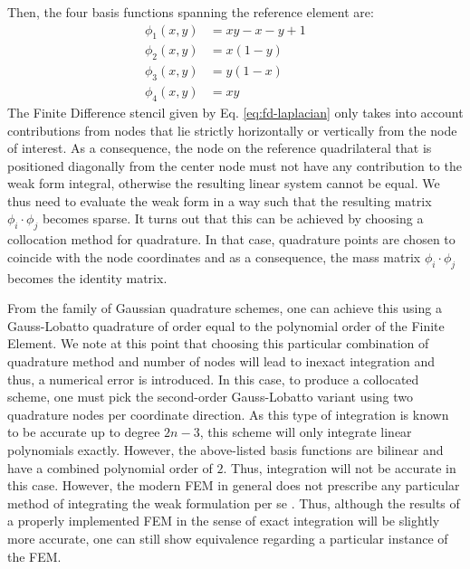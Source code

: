 \documentclass[asi,article,submit,moreauthors]{Definitions/mdpi}
\begin{document}
Then, the four basis functions spanning the reference element are:
\begin{align}
    \phi_1(x,y) &= xy - x - y + 1 &&\\
    \phi_2(x,y) &= x (1 - y) &&\\
    \phi_3(x,y) &= y (1 - x) &&\\
    \phi_4(x,y) &= x y &&
\end{align}
The Finite Difference stencil given by Eq. \ref{eq:fd-laplacian} only takes into account contributions from nodes that lie strictly horizontally or vertically from the node of interest.
As a consequence, the node on the reference quadrilateral that is positioned diagonally from the center node must not have any contribution to the weak form integral, otherwise the resulting linear system cannot be equal.
We thus need to evaluate the weak form in a way such that the resulting matrix $\phi_i \cdot \phi_j$ becomes sparse.
It turns out that this can be achieved by choosing a collocation method for quadrature.
In that case, quadrature points are chosen to coincide with the node coordinates and as a consequence, the mass matrix $\phi_i \cdot \phi_j$ becomes the identity matrix.

From the family of Gaussian quadrature schemes, one can achieve this using a Gauss-Lobatto quadrature of order equal to the polynomial order of the Finite Element.
We note at this point that choosing this particular combination of quadrature method and number of nodes will lead to inexact integration and thus, a numerical error is introduced.
In this case, to produce a collocated scheme, one must pick the second-order Gauss-Lobatto variant using two quadrature nodes per coordinate direction.
As this type of integration is known to be accurate up to degree $2n-3$, this scheme will only integrate linear polynomials exactly.
However, the above-listed basis functions are bilinear and have a combined polynomial order of $2$.
Thus, integration will not be accurate in this case.
However, the modern FEM in general does not prescribe any particular method of integrating the weak formulation per se \cite{ciarletFiniteElementMethod2002}. 
Thus, although the results of a properly implemented FEM in the sense of exact integration will be slightly more accurate, one can still show equivalence regarding a particular instance of the FEM.
\end{document}
